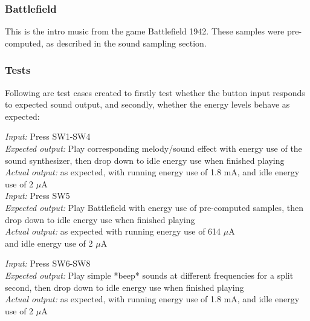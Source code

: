 \subsubsection{Battlefield}

This is the intro music from the game Battlefield 1942. These samples were pre-computed, as described in the sound sampling section. 

\subsubsection{Tests}

Following are test cases created to firstly test whether the button input responds to expected sound output, and secondly, whether the energy levels behave as expected:



\emph{Input: } Press SW1-SW4\\
\emph{Expected output: } Play corresponding melody/sound effect with energy use of the sound synthesizer, then drop down to idle energy use when finished playing\\
\emph{Actual output: } as expected, with running energy use of 1.8 mA, and idle energy use of 2 $\mu$A \\


\emph{Input: } Press SW5\\
\emph{Expected output: } Play Battlefield with energy use of pre-computed samples, then drop down to idle energy use when finished playing\\
\emph{Actual output: } as expected with running energy use of 614 $\mu$A \\ and idle energy use of 2 $\mu$A \

\emph{Input: } Press SW6-SW8\\
\emph{Expected output: } Play simple *beep* sounds at different frequencies for a split second, then drop down to idle energy use when finished playing\\
\emph{Actual output: } as expected, with running energy use of 1.8 mA, and idle energy use of 2 $\mu$A \\

